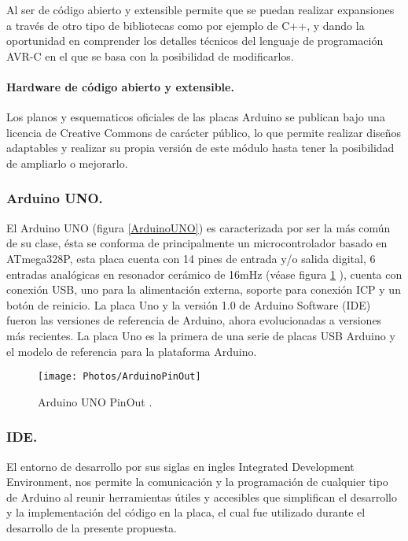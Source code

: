 \documentclass[11pt,letter
								]
								{article}
\begin{document}
Al ser de código abierto y extensible  permite que  se    puedan realizar expansiones a través de otro tipo de  bibliotecas  como por ejemplo de C++, y dando la oportunidad en comprender los detalles técnicos del  lenguaje de programación AVR-C en el que se basa con la posibilidad de modificarlos.%

\paragraph{Hardware de código abierto y extensible. }

Los planos y esquematicos oficiales de las placas Arduino se publican bajo una licencia de Creative Commons de carácter público, lo que permite realizar diseños adaptables y realizar su propia versión de este módulo hasta tener la posibilidad de ampliarlo o mejorarlo.



\subsubsection{Arduino UNO. }
El Arduino UNO (figura \ref{ArduinoUNO})  es caracterizada por ser la  más común de su clase, ésta se conforma de  principalmente un microcontrolador basado en ATmega328P, esta placa cuenta con  14 pines de entrada y/o  salida digital, 6 entradas analógicas en resonador cerámico de 16mHz (véase figura \ref{6} ), cuenta con conexión USB, uno para la alimentación externa, soporte para conexión ICP y un botón de reinicio. La placa Uno y la versión 1.0 de Arduino Software (IDE) fueron las versiones de referencia de Arduino, ahora evolucionadas a versiones más recientes. La placa Uno es la primera de una serie de placas USB Arduino y el modelo de referencia para la plataforma Arduino.\cite{UNIT1}

\begin{figure}[H]
\centering
\texttt{[image: Photos/ArduinoPinOut]}
\caption{Arduino UNO PinOut \cite{ArduinoWeb2}. } 
\label{6}
\end{figure}


\subsubsection{IDE.} 
El entorno de desarrollo por sus siglas en ingles Integrated  Development  Environment, nos permite  la comunicación y la  programación de cualquier tipo de Arduino al reunir  herramientas útiles y accesibles que simplifican el desarrollo y la  implementación del código en la placa, el cual fue utilizado durante el desarrollo de la presente propuesta.
\end{document}
